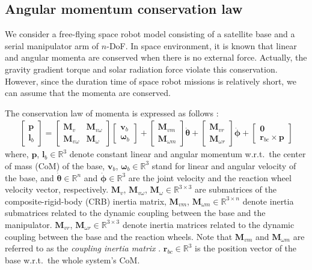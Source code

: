 \documentclass[preprint,12pt]{elsarticle}
\def\R#1{{\in\mathbb{R}^{#1}}}
\def\thd{{\dot{\bbm{\theta}}}}
\def\phd{{\dot{{\bbm{\phi}}}}}
\def\bbm#1{\bm{#1}}
\begin{document}
\subsection{Angular momentum conservation law}
\label{sec:ANG_MOM}
We consider a free-flying space robot model consisting of a satellite base and a serial manipulator arm
of $n$-DoF.
In space environment,
it is known that linear and angular momenta are conserved when there is no external force.
Actually,
the gravity gradient torque and solar radiation force violate this conservation.
However,
since the duration time of space robot missions is relatively short,
we can assume that the momenta are conserved.

The conservation law of momenta is expressed as follows \cite{Dimitrov2004}:
%
\begin{align}
  \begin{bmatrix}
    \bm{p}\\
    \bm{l}_{b}
  \end{bmatrix}
  =
  \begin{bmatrix}
    \bm{M}_{v} & \bm{M}_{v\omega}\\
    \bm{M}_{v \omega} & \bm{M}_{\omega}
  \end{bmatrix}
  \begin{bmatrix}
    \bm{v}_{b}\\
    \bm{\omega}_{b}
  \end{bmatrix}
  +
  \begin{bmatrix}
    \bm{M}_{v m}\\
    \bm{M}_{\omega m}
  \end{bmatrix}\thd
  +
  \begin{bmatrix}
    \bm{M}_{v r}\\
    \bm{M}_{\omega r}
  \end{bmatrix}\phd
  +
  \begin{bmatrix}
    \bm{0}\\
    \bm{r}_{bc}\times \bm{p}
  \end{bmatrix}
\end{align}
%
where,
$\bm{p}$,
$\bm{l}_{b}\R{3}$ denote constant linear and angular momentum w.r.t.\ the center of mass (CoM)
of the base,
$\bm{v}_{b}$,
$\bm{\omega}_{b}\R{3}$ stand for linear and angular velocity of the base,
and $\thd\R{n}$ and
$\phd\R{3}$ are the joint velocity and the reaction wheel velocity vector, respectively.
$\bm{M}_{v}$,
$\bm{M}_{v\omega}$,
$\bm{M}_{\omega}\R{3\times 3}$ are submatrices of the composite-rigid-body (CRB) inertia matrix,
$\bm{M}_{vm}$,
$\bm{M}_{\omega m}\R{3\times n}$ denote inertia submatrices related to the dynamic coupling
between the base and the manipulator.
$\bm{M}_{v r}$,
$\bm{M}_{\omega r}\R{3 \times 3}$ denote inertia matrices related to the dynamic coupling
between the base and the reaction wheels.
Note that $\bm{M}_{vm}$ and $\bm{M}_{\omega m}$ are referred to as the \textit{coupling inertia matrix} \cite{Nenchev1999}.
$\bm{r}_{bc}\R{3}$ is the position vector of the base w.r.t.\ the whole system's CoM.
\end{document}
